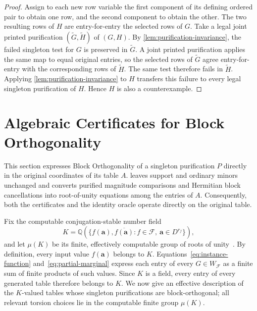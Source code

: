 \documentclass[11pt]{article}
\theoremstyle{plain}
\theoremstyle{definition}
\theoremstyle{remark}
\newcommand{\cF}{\mathcal F}
\begin{document}
\begin{proof}
Assign to each new row variable the first component of its defining ordered
pair to obtain one row, and the second component to obtain the other.  The two
resulting rows of $H$ are entry-for-entry the selected rows of $G$.  Take a
legal joint printed purification
$(\widetilde G,\widetilde H)$ of $(G,H)$.  By
\cref{lem:purification-invariance}, the failed singleton test for $G$ is
preserved in $\widetilde G$.  A joint printed purification applies the same
map to equal original entries, so the selected rows of $\widetilde G$ agree
entry-for-entry with the corresponding rows of $\widetilde H$.  The same
test therefore fails in $\widetilde H$.  Applying
\cref{lem:purification-invariance} to $H$ transfers this failure to every
legal singleton purification of $H$.  Hence $H$ is also a counterexample.
\end{proof}

\section{Algebraic Certificates for Block Orthogonality}
\label{sec:bo-certificates}

This section expresses Block Orthogonality of a singleton purification $P$
directly in the original coordinates of its table $A$.
 leaves support and ordinary minors
unchanged and converts purified magnitude comparisons and Hermitian block
cancellations into root-of-unity equations among the entries of $A$.
Consequently, both the certificates and the identity oracle operate directly
on the original table.

Fix the computable conjugation-stable number field
\begin{equation}
  K=\mathbb Q\left(
      \{f(\mathbf a),\overline{f(\mathbf a)}:
        f\in\cF,\ \mathbf a\in D^{r_f}\}
    \right),
  \label{eq:working-field}
\end{equation}
and let $\mu(K)$ be its finite, effectively computable group of roots of
unity~\cite{Cohen1993}.  By definition, every input value
$f(\mathbf a)$ belongs to $K$.  Equations~\eqref{eq:instance-function}
and~\eqref{eq:partial-marginal} express each entry of every
$G\in W_{\cF}$ as a finite sum of finite products of such values.  Since
$K$ is a field, every entry of every generated table therefore belongs to
$K$.  We now give an effective description of the $K$-valued tables whose
singleton purifications are block-orthogonal; all relevant torsion choices
lie in the computable finite group $\mu(K)$.
\end{document}
